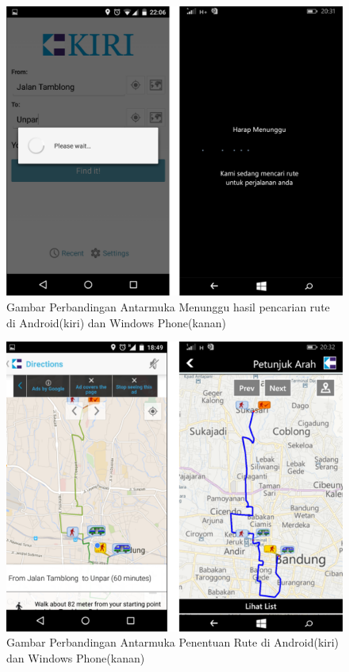 	\begin{figure}[!h]
		\centering
			\includegraphics[scale=0.16]{Gambar/perbandingan/perbandingan_menunggu}
		\caption{Gambar Perbandingan Antarmuka Menunggu hasil pencarian rute di Android(kiri) dan Windows Phone(kanan)}
		\label{fig:perbandinganMenunggu}
	\end{figure}
	
	\begin{figure}[!h]
		\centering
			\includegraphics[scale=0.16]{Gambar/perbandingan/perbandingan_route}
		\caption{Gambar Perbandingan Antarmuka Penentuan Rute di Android(kiri) dan Windows Phone(kanan)}
		\label{fig:perbandinganRoute}
	\end{figure}
	
